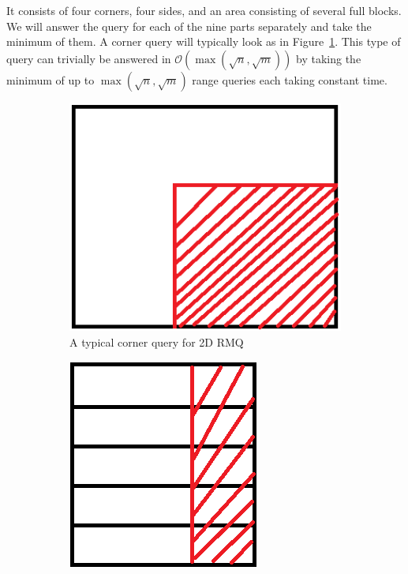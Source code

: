 \documentclass[a4paper,oneside,article,11pt]{memoir}
\begin{document}
It consists of four corners, four sides, and an area consisting of several full blocks. We will answer the query for each of the nine parts separately and take the minimum of them.
A corner query will typically look as in Figure~\ref{fig:rmq_corner}. This type of query can trivially be answered in $\mathcal{O}(\max(\sqrt{n},\sqrt{m}))$ by taking the minimum of up to $\max(\sqrt{n},\sqrt{m})$ range queries each taking constant time.
\begin{figure}[htbp!]
    \centering
    \begin{subfigure}[b]{0.49\textwidth}
        \includegraphics[width=\textwidth]{../figures/RMQ_corner.png}
        \caption{A typical corner query for 2D RMQ}
        \label{fig:rmq_corner}
    \end{subfigure}
    \begin{subfigure}[b]{0.49\textwidth}
        \includegraphics[width=\textwidth]{../figures/RMQ_side.png}

\end{subfigure}
\end{figure}
\end{document}
